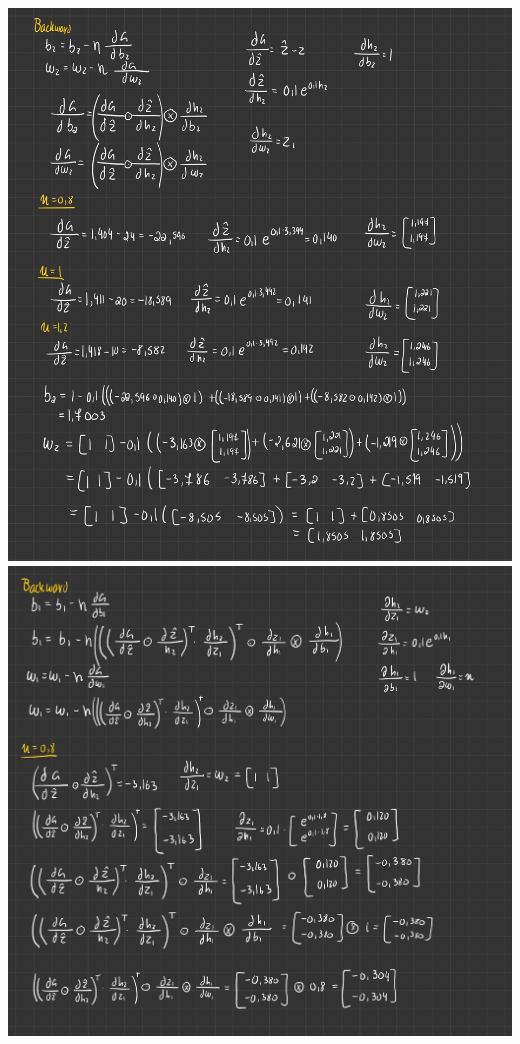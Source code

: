\documentclass[12pt]{article}
\begin{document}
\begin{enumerate}[leftmargin=\labelsep]
\begin{center}
\newline
\includegraphics[scale=0.3]{images/hw3-2.jpg}
\newline
\includegraphics[scale=0.3]{images/hw3-3.jpg}

\end{center}
\end{enumerate}
\end{document}
